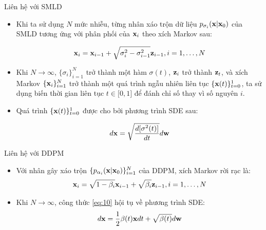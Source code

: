 \documentclass[10pt]{beamer}
\theoremstyle{remark}
\numberwithin{algocf}{section}
\numberwithin{equation}{section}
\numberwithin{dl}{section}
\numberwithin{figure}{section}
\begin{document}
\begin{frame}{Liên hệ với SMLD}
	\begin{itemize}
		\item Khi ta sử dụng $N$ mức nhiễu, từng nhân xáo trộn dữ liệu $p_{\sigma_i}(\bold{x} \vert \bold{x}_0)$ của SMLD tương ứng với phân phối của $\bold{x}_i$ theo xích Markov sau:

		\begin{equation}
		    \bold{x}_i = \bold{x}_{i-1} + \sqrt{\sigma_i^2 - \sigma_{i-1}^2} \bold{z}_{i-1}, i=1, \dots, N
		\end{equation}
		\item Khi $N \rightarrow \infty$, $\lbrace \sigma_i \rbrace_{i=1}^N$ trở thành một hàm $\sigma(t)$, $\bold{z}_i$ trở thành $\bold{z}_t$, và xích Markov $\lbrace \bold{x}_i \rbrace_{i=1}^N$ trở thành một quá trình ngẫu nhiên liên tục $\lbrace \bold{x}(t) \rbrace_{t=0}^1$, ta sử dụng biến thời gian liên tục $t \in \lbrack 0, 1 \rbrack$ để đánh chỉ số thay vì số nguyên $i$.
		\item Quá trình $\lbrace \bold{x}(t) \rbrace_{t=0}^1$ được cho bởi phương trình SDE sau:

		\begin{equation} \label{eq:9}
			d \bold{x} = \sqrt{\dfrac{d \lbrack \sigma^2(t) \rbrack}{dt}} d \bold{w}
		\end{equation}
	\end{itemize}
\end{frame}

\begin{frame}{Liên hệ với DDPM}
	\begin{itemize}
		\item Với nhân gây xáo trộn $\lbrace p_{\alpha_i} (\bold{x} \vert \bold{x}_0) \rbrace_{i=1}^N$ của DDPM, xích Markov rời rạc là:
		\begin{equation} \label{eq:10}
			\bold{x}_i = \sqrt{1 - \beta_i} \bold{x}_{i-1} + \sqrt{\beta_i} \bold{z}_{i-1}, i=1,\dots,N
		\end{equation}
		\item Khi $N \rightarrow \infty$, công thức \ref{eq:10} hội tụ về phương trình SDE:
		\begin{equation} \label{eq:11}
			d \bold{x} = \dfrac{1}{2} \beta(t) \bold{x} dt + \sqrt{\beta(t)} d\bold{w}
		\end{equation}
	\end{itemize}
\end{frame}
\end{document}

